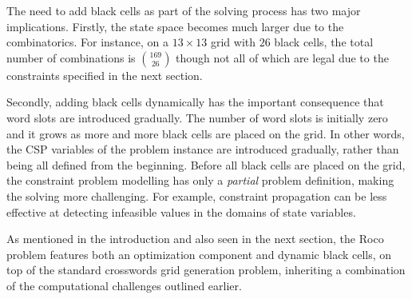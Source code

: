 The need to add black cells as part of the solving process has two 
major implications.
Firstly, the state space becomes much larger due to the combinatorics.
For instance, on a $13 \times 13$ grid with $26$
black cells, the total number of combinations is $169 \choose 26$ though
not all of which are legal due to the constraints
specified in the next section.

Secondly, adding black cells dynamically has the important consequence that
word slots are introduced gradually.
The number of word slots is initially zero and it grows
as more and more black cells are placed on the grid.
In other words, the CSP variables of the problem instance are introduced gradually,
rather than being all defined from the beginning.
Before all black cells are placed on the grid, 
the constraint problem modelling has only a \emph{partial} problem definition,
making the solving more challenging.
For example, constraint propagation can be less effective
at detecting infeasible values in the domains of state variables.

As mentioned in the introduction and also seen in the next section, the {\sc Roco} problem features both 
an optimization component and dynamic black cells, on top of the
standard crosswords grid generation problem,
inheriting a combination of 
the computational challenges outlined earlier.